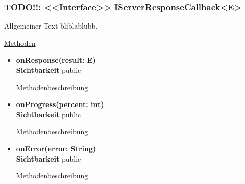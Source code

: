 \subsubsection{TODO!!: <<Interface>> IServerResponseCallback<E>} \label{app:klasse:IServerResponseCallback}
Allgemeiner Text bliblablubb. \newline

\underline{Methoden}
\begin{itemize}
\itemsep0pt
\item \textbf{onResponse(result: E)}\hfill\\
\textbf{Sichtbarkeit} public

Methodenbeschreibung

\item \textbf{onProgress(percent: int)}\hfill\\
\textbf{Sichtbarkeit} public

Methodenbeschreibung

\item \textbf{onError(error: String)}\hfill\\
\textbf{Sichtbarkeit} public

Methodenbeschreibung

\end{itemize}